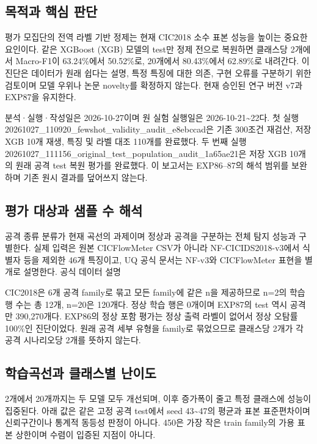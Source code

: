 

\subsection{목적과 핵심 판단}
평가 모집단의 전역 라벨 기반 정제는 현재 CIC2018 소수 표본 성능을 높이는 중요한 요인이다. 같은 XGBoost (XGB) 모델의 test만 정제 전으로 복원하면 클래스당 2개에서 Macro-F1이 63.24\%에서 50.52\%로, 20개에서 80.43\%에서 62.89\%로 내려간다. 이 진단은 데이터가 원래 쉽다는 설명, 특정 특징에 대한 의존, 구현 오류를 구분하기 위한 검토이며 모델 우위나 논문 novelty를 확정하지 않는다. 현재 승인된 연구 버전 v7과 EXP87을 유지한다.

분석·실행·작성일은 2026-10-27이며 원 실험 실행일은 2026-10-21\textasciitilde{}22다. 첫 실행 20261027\_\allowbreak{}110920\_\allowbreak{}fewshot\_\allowbreak{}validity\_\allowbreak{}audit\_\allowbreak{}e8ebccad은 기존 300조건 재검산, 저장 XGB 10개 재생, 특징 및 라벨 대조 110개를 완료했다. 두 번째 실행 20261027\_\allowbreak{}111156\_\allowbreak{}original\_\allowbreak{}test\_\allowbreak{}population\_\allowbreak{}audit\_\allowbreak{}1a65ae21은 저장 XGB 10개의 원래 공격 test 복원 평가를 완료했다. 이 보고서는 EXP86–87의 해석 범위를 보완하며 기존 원시 결과를 덮어쓰지 않는다.

\subsection{평가 대상과 샘플 수 해석}
공격 종류 분류가 현재 곡선의 과제이며 정상과 공격을 구분하는 전체 탐지 성능과 구별한다. 실제 입력은 원본 CICFlowMeter CSV가 아니라 NF-CICIDS2018-v3에서 식별자 등을 제외한 46개 특징이고, UQ 공식 문서는 NF-v3와 CICFlowMeter 표현을 별개로 설명한다. 공식 데이터 설명

CIC2018은 6개 공격 family로 묶고 모든 family에 같은 n을 제공하므로 n=\allowbreak{}2의 학습 행 수는 총 12개, n=\allowbreak{}20은 120개다. 정상 학습 행은 0개이며 EXP87의 test 역시 공격만 390,270개다. EXP86의 정상 포함 평가는 정상 출력 라벨이 없어서 정상 오탐률 100\%인 진단이었다. 원래 공격 세부 유형을 family로 묶었으므로 클래스당 2개가 각 공격 시나리오당 2개를 뜻하지 않는다.

\subsection{학습곡선과 클래스별 난이도}
2개에서 20개까지는 두 모델 모두 개선되며, 이후 증가폭이 줄고 특정 클래스에 성능이 집중된다. 아래 값은 같은 고정 공격 test에서 seed 43\textasciitilde{}47의 평균과 표본 표준편차이며 신뢰구간이나 통계적 동등성 판정이 아니다. 450은 가장 작은 train family의 가용 표본 상한이며 수렴이 입증된 지점이 아니다.

